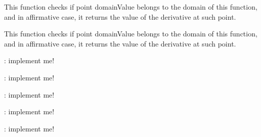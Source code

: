 \begin{DoxyRefList}
\item[\label{todo__todo000009}%
\hypertarget{todo__todo000009}{}%
Member \hyperlink{class_q_u_e_s_o_1_1_lagrange_basis1_d1_d_function_a2c804510956c3eb8f81bf5eb6fe7939c}{Q\-U\-E\-S\-O\-:\-:Lagrange\-Basis1\-D1\-D\-Function\-:\-:deriv} (double domain\-Value) const ]This function checks if point {\ttfamily domain\-Value} belongs to the domain of {\ttfamily this} function, and in affirmative case, it returns the value of the derivative at such point.  
\item[\label{todo__todo000008}%
\hypertarget{todo__todo000008}{}%
Member \hyperlink{class_q_u_e_s_o_1_1_lagrange_polynomial1_d1_d_function_a202ba706747ba35cf699799fbc3dbb8b}{Q\-U\-E\-S\-O\-:\-:Lagrange\-Polynomial1\-D1\-D\-Function\-:\-:deriv} (double domain\-Value) const ]This function checks if point {\ttfamily domain\-Value} belongs to the domain of {\ttfamily this} function, and in affirmative case, it returns the value of the derivative at such point.  
\item[\label{todo__todo000036}%
\hypertarget{todo__todo000036}{}%
Member \hyperlink{class_q_u_e_s_o_1_1_log_normal_vector_r_v_a150a212058169e2b708e82c8faff61eb}{Q\-U\-E\-S\-O\-:\-:Log\-Normal\-Vector\-R\-V$<$ V, M $>$\-:\-:print} (std\-::ostream \&os) const ]\-: implement me!  
\item[\label{todo__todo000037}%
\hypertarget{todo__todo000037}{}%
Member \hyperlink{class_q_u_e_s_o_1_1_markov_chain_position_data_a25bc5762fc4883882ca635dd83772a78}{Q\-U\-E\-S\-O\-:\-:Markov\-Chain\-Position\-Data$<$ V $>$\-:\-:print} (std\-::ostream \&os) const ]\-: implement me!  
\item[\label{todo__todo000038}%
\hypertarget{todo__todo000038}{}%
Member \hyperlink{class_q_u_e_s_o_1_1_metropolis_hastings_s_g_aed301deea1c0eab1a7d9e4a332729141}{Q\-U\-E\-S\-O\-:\-:Metropolis\-Hastings\-S\-G$<$ P\-\_\-\-V, P\-\_\-\-M $>$\-:\-:print} (std\-::ostream \&os) const ]\-: implement me!  
\item[\label{todo__todo000039}%
\hypertarget{todo__todo000039}{}%
Member \hyperlink{class_q_u_e_s_o_1_1_m_l_sampling_aec103dbc7af1af9e982d8c162033e77b}{Q\-U\-E\-S\-O\-:\-:M\-L\-Sampling$<$ P\-\_\-\-V, P\-\_\-\-M $>$\-:\-:print} (std\-::ostream \&os) const ]\-: implement me!  
\item[\label{todo__todo000040}%
\hypertarget{todo__todo000040}{}%
Member \hyperlink{class_q_u_e_s_o_1_1_powered_joint_pdf_ae4d7e2a318f317652ebbf926d8a3391c}{Q\-U\-E\-S\-O\-:\-:Powered\-Joint\-Pdf$<$ V, M $>$\-:\-:compute\-Log\-Of\-Normalization\-Factor} (unsigned int num\-Samples, bool update\-Factor\-Internally) const ]\-: implement me!  

\end{DoxyRefList}
